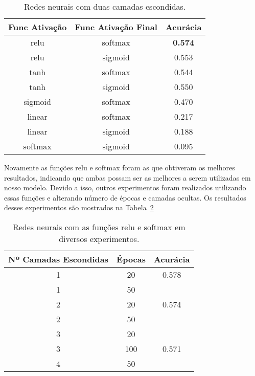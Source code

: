 \documentclass[conference]{IEEEtran}
\begin{document}
\begin{table}[h!]
	\centering	
	\begin{tabular}{ccc} \toprule
		\textbf{Func Ativação} & \textbf{Func Ativação Final} & \textbf{Acurácia} \\ \toprule 	
		relu                   & softmax                      & \textbf{0.574}             \\
		relu                   & sigmoid                      & 0.553             \\
		tanh                   & softmax                      & 0.544             \\
		tanh                   & sigmoid                      & 0.550             \\
		sigmoid                & softmax                      & 0.470             \\
		linear                 & softmax                      & 0.217             \\
		linear                 & sigmoid                      & 0.188             \\
		softmax                & sigmoid                      & 0.095             \\ \bottomrule      
	\end{tabular}
	\caption{Redes neurais com duas camadas escondidas.}
	\label{tab:2hl}
\end{table}

Novamente as funções relu e softmax foram as que obtiveram os melhores resultados, indicando que ambas possam ser as melhores a serem utilizadas em nosso modelo. Devido a isso, outros experimentos foram realizados utilizando essas funções e alterando número de épocas e camadas ocultas. Os resultados desses experimentos são mostrados na Tabela~\ref{tab:misc} 


\begin{table}[h!]
	\centering
	
	\begin{tabular}{ccc} \toprule
	\textbf{Nº Camadas Escondidas} & \textbf{Épocas} & \textbf{Acurácia}    \\ \toprule 	
	1                              & 20              & 0.578                \\
	1                              & 50              & \multicolumn{1}{l}{} \\
	2                              & 20              & 0.574                \\
	2                              & 50              &                      \\
	3                              & 20              &                      \\
	3                              & 100             & 0.571                \\
	4                              & 50              &                      \\
	\bottomrule      
	\end{tabular}
	\caption{Redes neurais com as funções relu e softmax em diversos experimentos.}
	\label{tab:misc}
\end{table}
\end{document}
